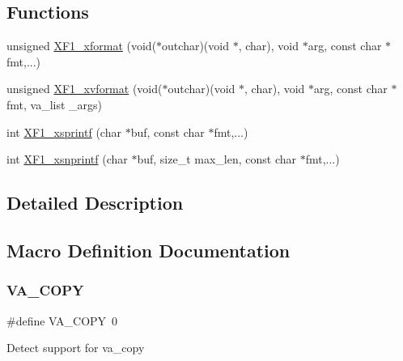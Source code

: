 \subsection*{Functions}
\begin{DoxyCompactItemize}
\item 
unsigned \hyperlink{group___x_f1__module_gad82f9eebca6a56e889c4845f665e6ec5}{X\+F1\+\_\+xformat} (void($\ast$outchar)(void $\ast$, char), void $\ast$arg, const char $\ast$fmt,...)
\item 
unsigned \hyperlink{group___x_f1__module_gafbe3cf6f584b9470ee5aadccefb5a679}{X\+F1\+\_\+xvformat} (void($\ast$outchar)(void $\ast$, char), void $\ast$arg, const char $\ast$fmt, va\+\_\+list \+\_\+args)
\item 
int \hyperlink{group___x_f1__module_ga0395629bfb289c7da253651b5033253a}{X\+F1\+\_\+xsprintf} (char $\ast$buf, const char $\ast$fmt,...)
\item 
int \hyperlink{group___x_f1__module_ga1cb536ef0f4298352b52d2f1a53579dd}{X\+F1\+\_\+xsnprintf} (char $\ast$buf, size\+\_\+t max\+\_\+len, const char $\ast$fmt,...)
\end{DoxyCompactItemize}


\subsection{Detailed Description}


\subsection{Macro Definition Documentation}
\mbox{\label{group___x_f1__module_gae7f59f6cd0e5f8b38da9a6d94372b8be}} 
\subsubsection{\texorpdfstring{V\+A\+\_\+\+C\+O\+PY}{VA\_COPY}}
{\footnotesize\ttfamily \#define V\+A\+\_\+\+C\+O\+PY~0}

Detect support for va\+\_\+copy \mbox{\label{group___x_f1__module_gaa8062a55530f0cffb8482e915a9bd0f4}} 
